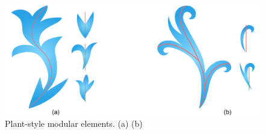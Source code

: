 \begin{figure}
\includegraphics[width=1.0\textwidth]{figures/conclusions/thread_branch_3.pdf}
\caption[Element threading and branching]
{ \label{thread_branch} 
\newtext
{
Plant-style modular elements.
(a) 
(b) 
}
}
\end{figure}





